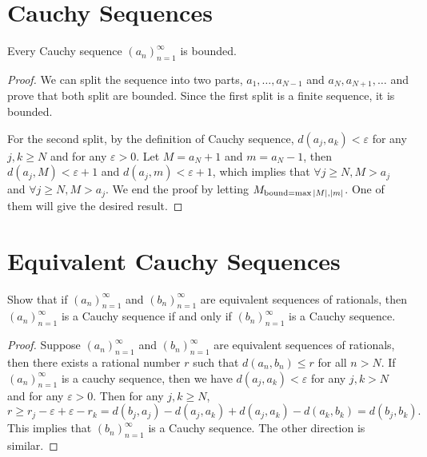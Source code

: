 \section{Cauchy Sequences}
\begin{exercise}
  Every Cauchy sequence $(a_n)_{n=1}^\infty$ is bounded.
\end{exercise}
\begin{proof}
  We can split the sequence into two parts, $a_1, \dots, a_{N-1}$ and $a_N, a_{N+1}, \dots$ and prove that both split are bounded.
  Since the first split is a finite sequence, it is bounded. 

  For the second split, by the definition of Cauchy sequence, $d(a_j, a_k) < \varepsilon$ for any $j, k \geq N$ and for any $\varepsilon > 0$.
  Let $M = a_N + 1$ and $m = a_N - 1$, then $d(a_j, M) < \varepsilon + 1$ and $d(a_j, m) < \varepsilon + 1$,
  which implies that $\forall j \geq N, M > a_j$ and $\forall j \geq N, M > a_j$. We end the proof by letting $M_{\text{bound} = \max{\abs{M}, \abs{m}}}$.
  One of them will give the desired result.
\end{proof}

\section{Equivalent Cauchy Sequences}

\begin{exercise}
  Show that if $(a_n)_{n=1}^\infty$ and $(b_n)_{n=1}^\infty$ are equivalent sequences of rationals,
  then $(a_n)_{n=1}^\infty$ is a Cauchy sequence if and only if $(b_n)_{n=1}^\infty$ is a Cauchy sequence.
\end{exercise}
\begin{proof}
  Suppose $(a_n)_{n=1}^\infty$ and $(b_n)_{n=1}^\infty$ are equivalent sequences of rationals,
  then there exists a rational number $r$ such that $d(a_n, b_n) \leq r$ for all $n > N$.
  If $(a_n)_{n=1}^\infty$ is a cauchy sequence, then we have $d(a_j, a_k) < \varepsilon$ for any $j, k > N$ and for any $\varepsilon > 0$.
  Then for any $j, k \geq N$, $$r \geq r_j - \varepsilon + \varepsilon - r_k = d(b_j, a_j) - d(a_j, a_k) + d(a_j, a_k)- d(a_k, b_k) = d(b_j, b_k).$$
  This implies that $(b_n)_{n=1}^\infty$ is a Cauchy sequence. The other direction is similar.
\end{proof}



